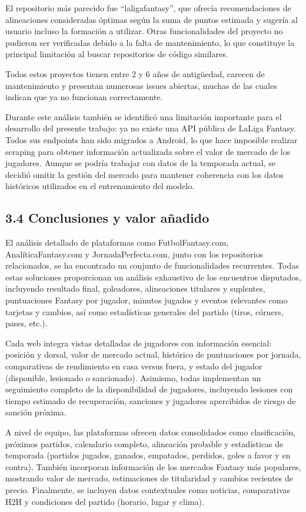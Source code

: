 El repositorio más parecido fue ``laligafantasy'', que ofrecía recomendaciones de alineaciones 
consideradas óptimas según la suma de puntos estimada y sugería al usuario incluso la formación a 
utilizar. Otras funcionalidades del proyecto no pudieron ser verificadas debido a la falta de 
mantenimiento, lo que constituye la principal limitación al buscar repositorios de código similares.

Todos estos proyectos tienen entre 2 y 6 años de antigüedad, carecen de mantenimiento y presentan 
numerosas issues abiertas, muchas de las cuales indican que ya no funcionan correctamente.

Durante este análisis también se identificó una limitación importante para el desarrollo del presente 
trabajo: ya no existe una API pública de LaLiga Fantasy. Todos sus endpoints han sido migrados a 
Android, lo que hace imposible realizar scraping para obtener información actualizada sobre el valor 
de mercado de los jugadores. Aunque se podría trabajar con datos de la temporada actual, se decidió 
omitir la gestión del mercado para mantener coherencia con los datos históricos utilizados en el 
entrenamiento del modelo.

\subsection{3.4 Conclusiones y valor añadido}

El análisis detallado de plataformas como FutbolFantasy.com, AnalíticaFantasy.com y 
JornadaPerfecta.com, junto con los repositorios relacionados, se ha encontrado un conjunto de 
funcionalidades recurrentes. Todas estas soluciones proporcionan un análisis exhaustivo de los 
encuentros disputados, incluyendo resultado final, goleadores, alineaciones titulares y suplentes, 
puntuaciones Fantasy por jugador, minutos jugados y eventos relevantes como tarjetas y cambios, así 
como estadísticas generales del partido (tiros, córners, pases, etc.).

Cada web integra vistas detalladas de jugadores con información esencial: posición y dorsal, 
valor de mercado actual, histórico de puntuaciones por jornada, comparativas de rendimiento en casa 
versus fuera, y estado del jugador (disponible, lesionado o sancionado). Asimismo, todas implementan 
un seguimiento completo de la disponibilidad de jugadores, incluyendo lesiones con tiempo estimado de 
recuperación, sanciones y jugadores apercibidos de riesgo de sanción próxima.

A nivel de equipo, las plataformas ofrecen datos consolidados como clasificación, próximos partidos, 
calendario completo, alineación probable y estadísticas de temporada (partidos jugados, ganados, 
empatados, perdidos, goles a favor y en contra). También incorporan información de los mercados 
Fantasy más populares, mostrando valor de mercado, estimaciones de titularidad y cambios recientes de 
precio. Finalmente, se incluyen datos contextuales como noticias, comparativas H2H y condiciones del 
partido (horario, lugar y clima).

